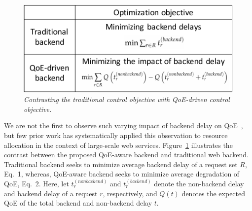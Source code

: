 \begin{figure}
	\centering
	\vspace{-0.3cm}
	\includegraphics[width=1.0\textwidth]{figs/objective-contrast.pdf}
	\caption{\em Contrasting the traditional control objective with QoE-driven control objective.}
	\label{fig:objective-contrast}
\end{figure}
We are not the first to observe such varying impact of backend delay on QoE~\cite{timecard,dqbarge,balachandran2014modeling}, but few prior work has systematically applied this observation to resource allocation in the context of large-scale web services. 
Figure~\ref{fig:objective-contrast} illustrates the contrast between the proposed QoE-aware backend and traditional web backend.
Traditional backend seeks to minimize average backend delay of a request set $R$, \ie Eq.~1,
whereas, QoE-aware backend seeks to minimize average degradation of QoE, \ie Eq.~2.
Here, let $t_{r}^{(nonbackend)}$ and $t_{r}^{(backend)}$ denote the non-backend delay and backend delay of a request $r$, respectively, and $Q(t)$ denotes the expected QoE of the total backend and non-backend delay $t$.

